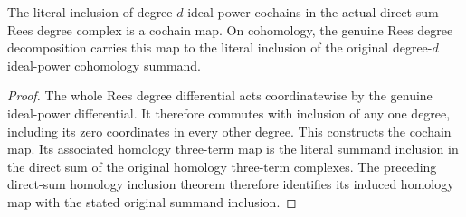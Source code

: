 \begin{lemma}
\label{lem:fc-rees-cech-degree-inclusions}
\leanok
The literal inclusion of degree-$d$ ideal-power cochains in the actual
direct-sum Rees degree complex is a cochain map. On cohomology, the genuine
Rees degree decomposition carries this map to the literal inclusion of
the original degree-$d$ ideal-power cohomology summand.
\end{lemma}
\begin{proof}
The whole Rees degree differential acts coordinatewise by the genuine
ideal-power differential. It therefore commutes with inclusion of any
one degree, including its zero coordinates in every other degree. This
constructs the cochain map. Its associated homology three-term map is
the literal summand inclusion in the direct sum of the original homology
three-term complexes. The preceding direct-sum homology inclusion theorem
therefore identifies its induced homology map with the stated original
summand inclusion.
\end{proof}

